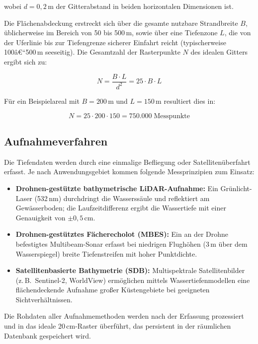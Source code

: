 ﻿\documentclass[a4paper,12pt]{article}
\theoremstyle{definition}
\begin{document}
\noindent
wobei $d = 0{,}2\,\text{m}$ der Gitterabstand in beiden horizontalen Dimensionen ist.

\medskip\noindent
Die Flächenabdeckung erstreckt sich über die gesamte nutzbare Strandbreite $B$, üblicherwei\-se
im Bereich von 50 bis 500\,m, sowie über eine Tiefenzone $L$, die von der Uferlinie bis zur
Tiefengrenze sicherer Einfahrt reicht (typischerweise 100â€“500\,m seeseitig). Die Gesamtzahl
der Rasterpunkte $N$ des idealen Gitters ergibt sich zu:

\begin{equation}
  N = \frac{B \cdot L}{d^2} = 25 \cdot B \cdot L
  \label{eq:gesamtpunkte}
\end{equation}

\noindent
Für ein Beispielareal mit $B = 200\,\text{m}$ und $L = 150\,\text{m}$ resultiert dies in:

\begin{equation}
  N = 25 \cdot 200 \cdot 150 = 750.000\; \text{Messpunkte}
\end{equation}

\subsection{Aufnahmeverfahren}

Die Tiefendaten werden durch eine einmalige Beflie\-gung oder Satelliten\-überfahrt
erfasst. Je nach Anwendungsgebiet kommen folgende Messprinzipien zum Einsatz:

\begin{itemize}
  \item \textbf{Drohnen-gestützte bathymetrische LiDAR-Aufnahme:} Ein Grünlicht-Laser
        (532\,nm) durchdringt die Wasserssäule und reflektiert am Gewässerboden; die
        Laufzeitdifferenz ergibt die Wassertiefe mit einer Genauigkeit von $\pm 0{,}5\,\text{cm}$.
  \item \textbf{Drohnen-gestütztes Fächerecholot (MBES):} Ein an der Drohne befestigtes
        Multibeam-Sonar erfasst bei niedrigen Flughöhen (3\,m über dem Wasserspiegel)
        breite Tiefenstreifen mit hoher Punktdichte.
  \item \textbf{Satellitenbasierte Bathymetrie (SDB):} Multispektrale Satellitenbilder
        (z.\,B.\ Sentinel-2, WorldView) ermöglichen mittels Wassertiefenmodellen eine
        flächendeckende Aufnahme gro\ss{}er Küstengebiete bei geeigneten Sichtverhältnissen.
\end{itemize}

\noindent
Die Rohdaten aller Aufnahmemethoden werden nach der Erfassung prozessiert und in das
ideale 20\,cm-Raster überführt, das persistent in der räumlichen Datenbank gespeichert wird.
\end{document}
